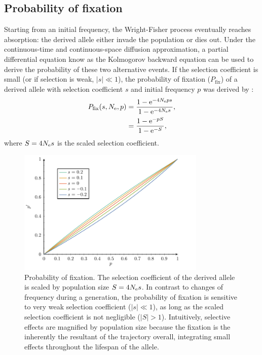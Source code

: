 \subsection{Probability of fixation}

Starting from an initial frequency, the Wright-Fisher process eventually reaches absorption: the derived \gls{allele} either invade the population or dies out.
Under the continuous-time and continuous-space diffusion approximation, a partial differential equation know as the Kolmogorov backward equation can be used to derive the probability of these two alternative events.
If the selection coefficient is small (or if selection is weak, $|s| \ll 1$), the probability of fixation ($P_{\mathrm{fix}}$) of a derived \gls{allele} with selection coefficient $s$ and initial frequency $p$ was derived by \citet{Kimura1962}:
\begin{align}
    P_{\mathrm{fix}}(s, N_{\textrm{e}}, p) & = \dfrac{1 - \mathrm{e}^{-4 N_{\textrm{e}} p s }}{1 - \mathrm{e}^{-4 N_{\textrm{e}} s}},\\
    & = \dfrac{1 - \mathrm{e}^{- p S }}{1 - \mathrm{e}^{-S}},
\end{align}
where $S = 4 N_{\textrm{e}} s$ is the scaled selection coefficient.
\begin{figure}[H]
    \centering
    \includegraphics[width=0.8\textwidth, page=3] {figures.pdf}
    \caption[Probability of fixation]{
    Probability of fixation.
    The selection coefficient of the derived \gls{allele} is scaled by population size $S=4 N_{\textrm{e}} s$.
    In contrast to changes of frequency during a generation, the probability of fixation is sensitive to very weak selection coefficient ($|s| \ll 1$), as long as the scaled selection coefficient is not negligible ($|S| > 1$).
    Intuitively, selective effects are magnified by population size because the fixation is the inherently the resultant of the trajectory overall, integrating small effects throughout the lifespan of the \gls{allele}. }
\end{figure}

